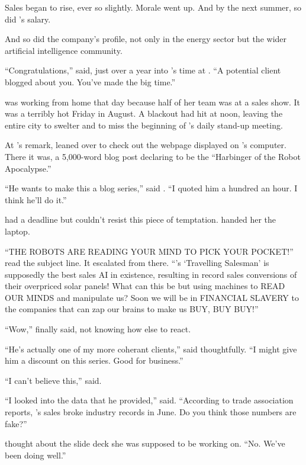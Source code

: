 Sales began to rise, ever so slightly. Morale went up. And by the next summer, so did {\protag}'s salary.

And so did the company's profile, not only in the energy sector but the wider artificial intelligence community.

``Congratulations,'' {\sidetag} said, just over a year into {\protag}'s time at {\energyCompany}. ``A potential client blogged about you. You've made the big time.''

{\protag} was working from home that day because half of her team was at a sales show. It was a terribly hot Friday in August. A blackout had hit \crunchyCity{} at noon, leaving the entire city to swelter and {\protag} to miss the beginning of {\energyCompany}'s daily stand-up meeting.

At {\sidetag}'s remark, {\protag} leaned over to check out the webpage displayed on {\sidetag}'s computer. There it was, a 5,000-word blog post declaring {\energyCompany} to be the ``Harbinger of the Robot Apocalypse.''

``He wants to make this a blog series,'' said {\sidetag}. ``I quoted him a hundred an hour. I think he'll do it.''

{\protag} had a deadline but couldn't resist this piece of temptation. {\sidetag} handed her the laptop.

``THE ROBOTS ARE READING YOUR MIND TO PICK YOUR POCKET!'' read the subject line. It escalated from there. ``{\energyCompany}'s `Travelling Salesman' is supposedly the best sales AI in existence, resulting in record sales conversions of their overpriced solar panels! What can this be but using machines to READ OUR MINDS and manipulate us? Soon we will be in FINANCIAL SLAVERY to the companies that can zap our brains to make us BUY, BUY BUY!''

``Wow,'' {\protag} finally said, not knowing how else to react.

``He's actually one of my more coherant clients,'' {\sidetag} said thoughtfully. ``I might give him a discount on this series. Good for business.''

``I can't believe this,'' {\protag} said.

``I looked into the data that he provided,'' {\sidetag} said. ``According to trade association reports, {\energyCompany}'s sales broke industry records in June. Do you think those numbers are fake?''

{\protag} thought about the slide deck she was supposed to be working on. ``No. We've been doing well.''

